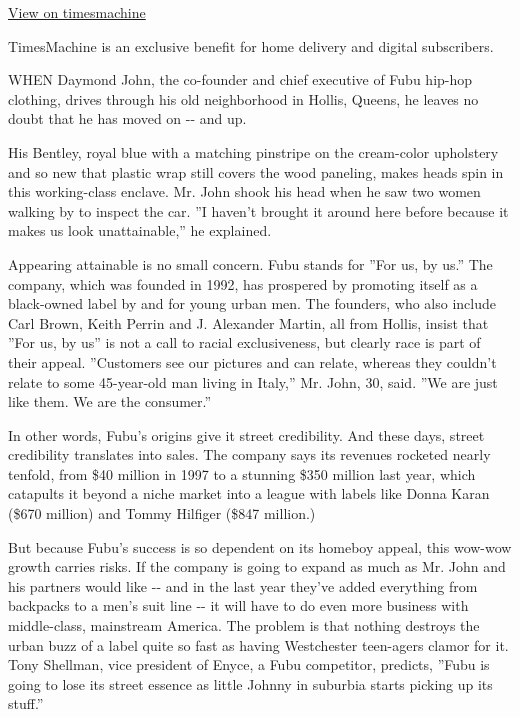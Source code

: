 \href{http://timesmachine.nytimes3xbfgragh.onion/timesmachine/1999/03/14/731145.html}{View
on timesmachine}

TimesMachine is an exclusive benefit for home delivery and digital
subscribers.

WHEN Daymond John, the co-founder and chief executive of Fubu hip-hop
clothing, drives through his old neighborhood in Hollis, Queens, he
leaves no doubt that he has moved on -\/- and up.

His Bentley, royal blue with a matching pinstripe on the cream-color
upholstery and so new that plastic wrap still covers the wood paneling,
makes heads spin in this working-class enclave. Mr. John shook his head
when he saw two women walking by to inspect the car. ''I haven't brought
it around here before because it makes us look unattainable,'' he
explained.

Appearing attainable is no small concern. Fubu stands for ''For us, by
us.'' The company, which was founded in 1992, has prospered by promoting
itself as a black-owned label by and for young urban men. The founders,
who also include Carl Brown, Keith Perrin and J. Alexander Martin, all
from Hollis, insist that ''For us, by us'' is not a call to racial
exclusiveness, but clearly race is part of their appeal. ''Customers see
our pictures and can relate, whereas they couldn't relate to some
45-year-old man living in Italy,'' Mr. John, 30, said. ''We are just
like them. We are the consumer.''

In other words, Fubu's origins give it street credibility. And these
days, street credibility translates into sales. The company says its
revenues rocketed nearly tenfold, from \$40 million in 1997 to a
stunning \$350 million last year, which catapults it beyond a niche
market into a league with labels like Donna Karan (\$670 million) and
Tommy Hilfiger (\$847 million.)

But because Fubu's success is so dependent on its homeboy appeal, this
wow-wow growth carries risks. If the company is going to expand as much
as Mr. John and his partners would like -\/- and in the last year
they've added everything from backpacks to a men's suit line -\/- it
will have to do even more business with middle-class, mainstream
America. The problem is that nothing destroys the urban buzz of a label
quite so fast as having Westchester teen-agers clamor for it. Tony
Shellman, vice president of Enyce, a Fubu competitor, predicts, ''Fubu
is going to lose its street essence as little Johnny in suburbia starts
picking up its stuff.''

